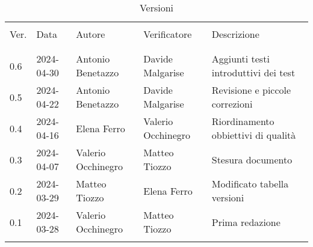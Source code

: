 \documentclass[italian,12pt]{article} %
\begin{document}

\newpage

\captionsetup[table]{list=no}
\begin{table}[!h]
	\caption*{Versioni}
	\footnotesize
	\begin{center}
		\begin{tabular}{ l l l l l }
			\hline                                                                                            \\[-2ex]
			Ver. & Data       & Autore             & Verificatore       & Descrizione                         \\
			\\[-2ex] \hline \\[-1.5ex]
			0.6  & 2024-04-30 & Antonio Benetazzo  & Davide Malgarise   & Aggiunti testi introduttivi dei test\\
			0.5  & 2024-04-22 & Antonio Benetazzo  & Davide Malgarise   & Revisione e piccole correzioni      \\
			0.4  & 2024-04-16 & Elena Ferro        & Valerio Occhinegro & Riordinamento obbiettivi di qualità \\
			0.3  & 2024-04-07 & Valerio Occhinegro & Matteo Tiozzo      & Stesura documento                   \\
			0.2  & 2024-03-29 & Matteo Tiozzo      & Elena Ferro        & Modificato tabella versioni         \\
			0.1  & 2024-03-28 & Valerio Occhinegro & Matteo Tiozzo      & Prima redazione                     \\
			\\[-1.5ex] \hline
		\end{tabular}
	\end{center}
\end{table}
\captionsetup[table]{list=yes}
\newpage
\tableofcontents
\listoftables
\listoffigures
\newpage





\end{document}
